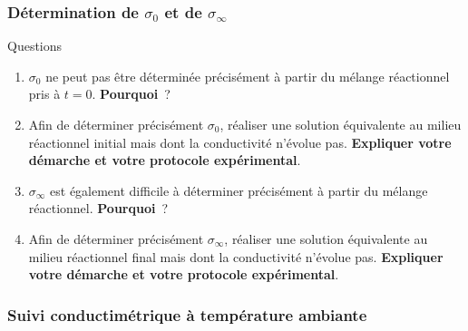 \documentclass[a4paper, 11pt, final, garamond]{book}
\begin{document}
\subsubsection{Détermination de $\sigma_0$ et de $\sigma_\infty$}
\begin{rexem}{Questions}
    \vspace{-10pt}
    \begin{enumerate}[label=\sqenumi, start=13]
        \item $\sigma_0$ ne peut pas être déterminée précisément à partir du mélange
            réactionnel pris à $t = 0$. \textbf{Pourquoi}~?
        \item Afin de déterminer précisément $\sigma_0$, réaliser une solution
            équivalente au milieu réactionnel initial mais dont la conductivité
            n'évolue pas. \textbf{Expliquer votre démarche et votre protocole
            expérimental}.
        \item $\sigma_\infty$ est également difficile à déterminer précisément à
            partir du mélange réactionnel. \textbf{Pourquoi}~?
        \item Afin de déterminer précisément $\sigma_\infty$, réaliser une solution
            équivalente au milieu réactionnel final mais dont la conductivité
            n'évolue pas. \textbf{Expliquer votre démarche et votre protocole
            expérimental}.
    \end{enumerate}
\end{rexem}
\vspace{-10pt}

\subsubsection{Suivi conductimétrique à température ambiante}
\end{document}
